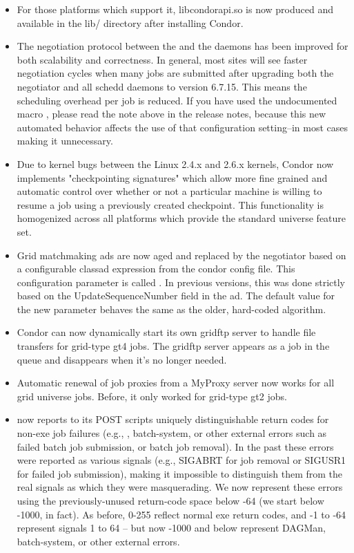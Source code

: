 \begin{itemize}

\item For those platforms which support it, libcondorapi.so is now
produced and available in the lib/ directory after installing Condor.

\item The negotiation protocol between the  and
the  daemons has been improved for both scalability and
correctness.  In general, most sites will see faster negotiation 
cycles when many jobs are submitted after upgrading both the negotiator
and all schedd daemons to version 6.7.15.  This means the scheduling overhead
per job is reduced.  If you have used the undocumented macro
, please read the note above in the release
notes, because this new automated behavior affects the use of that
configuration setting--in most cases making it unnecessary.

\item Due to kernel bugs between the Linux 2.4.x and 2.6.x kernels,
Condor now implements "checkpointing signatures" which allow more fine
grained and automatic control over whether or not a particular machine
is willing to resume a job using a previously created checkpoint. This functionality
is homogenized across all platforms which provide the standard universe
feature set.

\item Grid matchmaking ads are now aged and replaced by the negotiator 
based on a configurable classad expression from the condor config file. This
configuration parameter is called .  
In previous versions, this was done strictly based on the 
UpdateSequenceNumber field in the ad.  The default value for the new 
parameter behaves the same as the older, hard-coded algorithm.

\item Condor can now dynamically start its own gridftp server to handle
file transfers for grid-type gt4 jobs. The gridftp server appears
as a job in the queue and disappears when it's no longer needed.

\item Automatic renewal of job proxies from a MyProxy server now works for
all grid universe jobs. Before, it only worked for grid-type gt2 jobs.

\item {} now reports to its POST scripts uniquely
distinguishable return codes for non-exe job failures (e.g.,
, batch-system, or other external errors such as failed
batch job submission, or batch job removal).  In the past these errors
were reported as various signals (e.g., SIGABRT for job removal or
SIGUSR1 for failed job submission), making it impossible to
distinguish them from the real signals as which they were
masquerading.  We now represent these errors using the
previously-unused return-code space below -64 (we start below -1000,
in fact).  As before, 0-255 reflect normal exe return codes, and -1 to
-64 represent signals 1 to 64 -- but now -1000 and below represent
DAGMan, batch-system, or other external errors.


\end{itemize}
